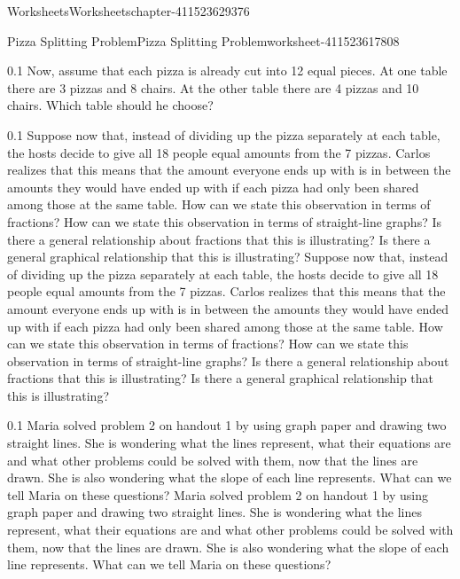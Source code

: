 \documentclass[twoside,11pt,]{book}
\begin{document}
\begin{chapterptx}{Worksheets}{}{Worksheets}{}{}{chapter-411523629376}
\begin{worksheet-section-numberless}{Pizza Splitting Problem}{}{Pizza Splitting Problem}{}{}{worksheet-411523617808}
\begin{divisionexercise}{2}{}{0.1}
{      }%
\hypertarget{p-411523591104}{}%
Now, assume that each pizza is already cut into 12 equal pieces. At one table there are 3 pizzas and 8 chairs.  At the other table there are 4 pizzas and 10 chairs.  Which table should he choose?%
\end{divisionexercise}%
\begin{divisionexercise}{3}{}{0.1}{
        Suppose now that, instead of dividing up the pizza separately at each table, the hosts decide to give all 18 people equal amounts from the 7 pizzas.  Carlos realizes that this means that the amount everyone ends up with is in between the amounts they would have ended up with if each pizza had only been shared among those at the same table.  How can we state this observation in terms of fractions?  How can we state this observation in terms of straight-line graphs?  Is there a general relationship about fractions that this is illustrating?  Is there a general graphical relationship that this is illustrating?
      }%
\hypertarget{p-411523589600}{}%
Suppose now that, instead of dividing up the pizza separately at each table, the hosts decide to give all 18 people equal amounts from the 7 pizzas.  Carlos realizes that this means that the amount everyone ends up with is in between the amounts they would have ended up with if each pizza had only been shared among those at the same table.  How can we state this observation in terms of fractions?  How can we state this observation in terms of straight-line graphs?  Is there a general relationship about fractions that this is illustrating?  Is there a general graphical relationship that this is illustrating?%
\end{divisionexercise}%
\clearpage
\begin{divisionexercise}{4}{}{0.1}{
        Maria solved problem 2 on handout 1 by using graph paper and drawing two straight lines.  She is wondering what the lines represent, what their equations are and what other problems could be solved with them, now that the lines are drawn.  She is also wondering what the slope of each line represents.  What can we tell Maria on these questions?
      }%
\hypertarget{p-411523587424}{}%
Maria solved problem 2 on handout 1 by using graph paper and drawing two straight lines.  She is wondering what the lines represent, what their equations are and what other problems could be solved with them, now that the lines are drawn.  She is also wondering what the slope of each line represents.  What can we tell Maria on these questions?%
\begin{sidebyside}{1}{0.05}{0.05}{0}%

\end{sidebyside}
\end{divisionexercise}
\end{worksheet-section-numberless}
\end{chapterptx}
\end{document}
